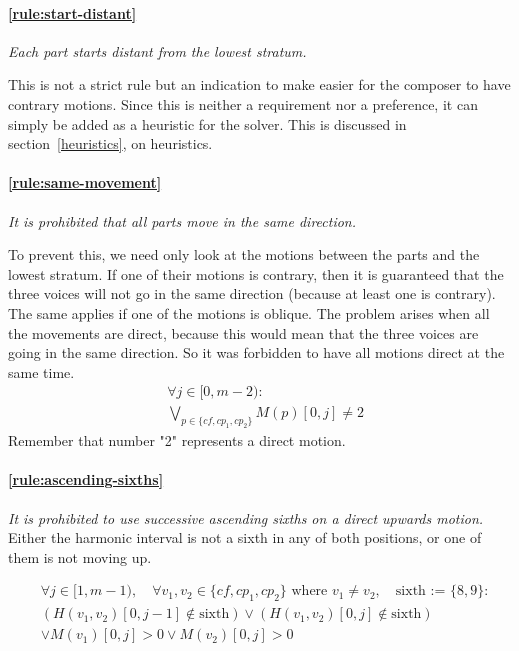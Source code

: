     \paragraph{\hspace{.6cm}\ref{rule:start-distant}}   \textit{Each part starts distant from the lowest stratum.}

    This is not a strict rule but an indication to make easier for the composer to have contrary motions. Since this is neither a requirement nor a preference, it can simply be added as a heuristic for the solver. This is discussed in section~\ref{heuristics}, on heuristics.


    \paragraph{\hspace{.6cm}\ref{rule:same-movement}}  \textit{It is prohibited that all parts move in the same direction.}

    To prevent this, we need only look at the motions between the parts and the lowest stratum. If one of their motions is contrary, then it is guaranteed that the three voices will not go in the same direction (because at least one is contrary). The same applies if one of the motions is oblique. The problem arises when all the movements are direct, because this would mean that the three voices are going in the same direction. So it was forbidden to have all motions direct at the same time.
    \begin{equation} \begin{aligned}
    &\forall j \in [0, m-2) \colon\\
    &\bigvee_{p \in \{cf, cp_1, cp_2\}}  M(p)[0, j] \neq 2
    \end{aligned} \end{equation}
    Remember that number "2" represents a direct motion.

    \paragraph{\hspace{.6cm}\ref{rule:ascending-sixths}}  \textit{It is prohibited to use successive ascending sixths on a direct upwards motion.}
    Either the harmonic interval is not a sixth in any of both positions, or one of them is not moving up.

    \begin{equation}
        \begin{aligned}
            & \forall j \in [1, m-1), \quad \forall v_1, v_2 \in \{cf, cp_1, cp_2\} \text{ where } v_1 \neq v_2, \quad \text{sixth := } \{8,9\} \colon \\
            & (H(v_1, v_2)[0, j-1] \notin \text{sixth}) \lor (H(v_1, v_2)[0, j] \notin \text{sixth}) \\
            & \lor M(v_1)[0, j] > 0 \lor M(v_2)[0, j] > 0
        \end{aligned}
        \end{equation}


